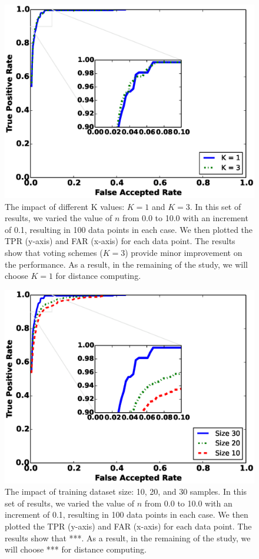 \begin{figure}
\includegraphics[width=\columnwidth]{figure/roc_k_value.eps}
\caption{\label{fig:roc_k_value} The impact of different K values: $K=1$ and $K=3$. In this set of results, we varied the value of $n$ from 0.0 to 10.0 with an increment of 0.1, resulting in 100 data points in each case. We then plotted the TPR (y-axis) and FAR (x-axis) for each data point. The results show that voting schemes ($K=3$) provide minor improvement on the performance. As a result, in the remaining of the study, we will choose $K=1$ for distance computing.}
\end{figure}



\begin{figure}[t]
\centering
\includegraphics [width=\columnwidth]{figure/roc_diff_size.eps}
\caption{The impact of training dataset size: 10, 20, and 30 samples. In this set of results, we varied the value of $n$ from 0.0 to 10.0 with an increment of 0.1, resulting in 100 data points in each case. We then plotted the TPR (y-axis) and FAR (x-axis) for each data point. The results show that ***. As a result, in the remaining of the study, we will choose *** for distance computing.}
\label{fig:roc_diff_size}
\end{figure}

